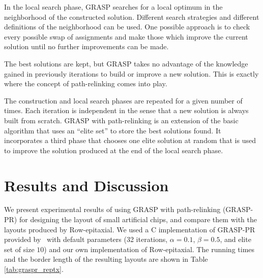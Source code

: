 \documentclass[english]{lni}
\newcommand{\ignore}[1]{}
\begin{document}
{In the local search phase, GRASP searches for a local optimum in the
neighborhood of the constructed solution. Different search strategies and
different definitions of the neighborhood can be used. One possible approach is
to check every possible swap of assignments and make those which improve the
current solution until no further improvements can be made.

The best
solutions are kept, but GRASP takes no advantage of the knowledge gained in
previously iterations to build or improve a new solution. This is exactly where
the concept of path-relinking comes into play.
}

The construction and local search phases are repeated for a given number of
times. Each iteration is independent in the sense that a new solution is always built
from scratch. GRASP with path-relinking is an extension of the basic algorithm
that uses an ``elite set'' to store the best solutions found. It incorporates
a third phase that chooses one elite solution at random that is used
to improve the solution produced at the end of the local search phase.

\ignore{
Solutions $p$ and $q$ are combined as follows. For every location
$k = 1, \ldots, n$, the path-relinking algorithm attempts to exchange facility
$p_k$ assigned to location $k$ in  solution $p$ with facility $q_k$ assigned to
location $k$ in the elite solution. In order to keep the solution $p$ feasible,
it exchanges $p_k$ with $p_l$, where $p_l = q_k$. This exchange is
performed only if it results in a better solution. The result of the
path-relinking phase is a solution $r$ that is as good as $p$ and $q$.
For more details on GRASP with path-relinking, we refer to~\cite{OLIVEIRA04}.
}

\section{Results and Discussion}
\label{sec:results}

We present experimental results of using GRASP with path-relinking (GRASP-PR)
for designing the layout of small artificial chips, and compare them with the
layouts produced by Row-epitaxial. We used a C implementation of GRASP-PR provided
by~\cite{OLIVEIRA04} with default parameters (32 iterations, $\alpha=0.1$,
$\beta=0.5$, and elite set of size $10$) and our own implementation of
Row-epitaxial. The running times and the border length of the resulting layouts are
shown in Table \ref{tab:graspr_reptx}.
\end{document}

